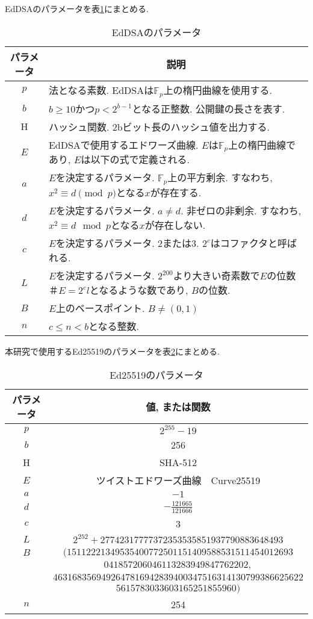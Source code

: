 EdDSAのパラメータを表\ref{tab:eddsa-parameters}にまとめる.\\
\captionsetup{font=normalsize} %
\begin{table}[htbp]
  \caption{EdDSAのパラメータ}
  \label{tab:eddsa-parameters}
  \centering
  \begin{tabular}{cp{10cm}}
    \hline
    \multicolumn{1}{c}{パラメータ} & \multicolumn{1}{c}{説明} \\ \hline \hline
    $p$ & 法となる素数. EdDSAは$\mathbb{F}_p$上の楕円曲線を使用する.\\
    $b$ & $b\geq 10$かつ$p<2^{b-1}$となる正整数. 公開鍵の長さを表す.\\
    H & ハッシュ関数. 2bビット長のハッシュ値を出力する. \\
    $E$ & EdDSAで使用するエドワーズ曲線. $E$は$\mathbb{F}_p$上の楕円曲線であり, $E$は以下の式で定義される.\\
    $a$ & $E$を決定するパラメータ. $\mathbb{F}_p$上の平方剰余. すなわち, $x^2\equiv d \pmod{p}$となる$x$が存在する.\\
    $d$ & $E$を決定するパラメータ. $a\neq d$. 非ゼロの非剰余. すなわち, $x^2\equiv d \mod{p}$となる$x$が存在しない.\\
    $c$ & $E$を決定するパラメータ. $2$または$3$. $2^{c}$はコファクタと呼ばれる.\\
    $L$ & $E$を決定するパラメータ. $2^{200}$より大きい奇素数で$E$の位数$＃E=2^{c}l$となるような数であり, $B$の位数.\\
    $B$ & $E$上のベースポイント. $B\neq (0,1)$\\
    $n$ & $c\leq n < b$となる整数.\\ \hline
  \end{tabular}
\end{table}

本研究で使用するEd25519のパラメータを表\ref{tab:ed25519-parameters}にまとめる.\\
\begin{longtable}{cc}
  \caption{Ed25519のパラメータ}
  \label{tab:ed25519-parameters}
  \endfirsthead
  \hline
  \multicolumn{1}{c}{パラメータ} & \multicolumn{1}{c}{値, または関数} \\ \hline \hline
  $p$ & $2^{255}-19$ \\
  $b$ & 256 \\
  H & SHA-512 \\
  $E$ & ツイストエドワーズ曲線　Curve25519 \\
  $a$ & $-1$ \\
  $d$ & $-\frac{121665}{121666}$ \\
  $c$ & 3 \\
  $L$ & $2^{252} + 27742317777372353535851937790883648493$ \\
  $B$ & $(15112221349535400772501151409588531511454012693$ \\
  & $041857206046113283949847762202,$\\
  & $4631683569492647816942839400347516314130799386625622$ \\
  & $5615783033603165251855960)$ \\
  $n$ & 254 \\ \hline
\end{longtable}

